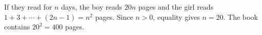 If they read for $n$ days, the boy reads $20n$ pages and the girl reads $1+3+\cdots+(2n-1)=n^2$ pages. Since $n>0$, equality gives $n=20$. The book contains $20^2=\boxed{400}$ pages.
